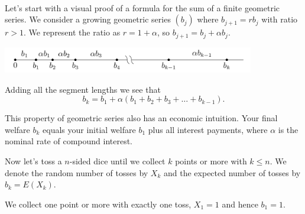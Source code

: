 \documentclass{article}
\theoremstyle{plain}
\begin{document}
\begin{filler}
[white]
\\


\noindent Let's start with a visual proof of a formula for the sum of a  finite geometric series.
We consider a growing geometric series $(b_j)$ where $b_{j + 1} = r b_j$ with ratio $r > 1$.
We represent the ratio as $r = 1 + \alpha$, so $b_{j + 1} = b_j + \alpha b_j$.

\includegraphics[width=11cm]{geometric_series.png}




		

Adding all the segment lengths we see that
\[
b_{k} = b_1 + \alpha (b_1 + b_2 + b_3 + \ldots + b_{k-1}).
\]

This property of geometric series also has an economic intuition. 
Your final welfare $b_k$ equals your initial welfare $b_1$ plus all interest payments,
where $\alpha$ is the nominal rate of compound interest.


Now let's toss a $n$-sided dice until we collect $k$ points or more with $k\leq n$.
We denote the random number of tosses by $X_k$ and the expected number of tosses 
by $b_k = E(X_k)$. 

We collect one point or more with exactly one toss, $X_1 = 1$ and hence $b_1 = 1$. 


\end{filler}
\end{document}

